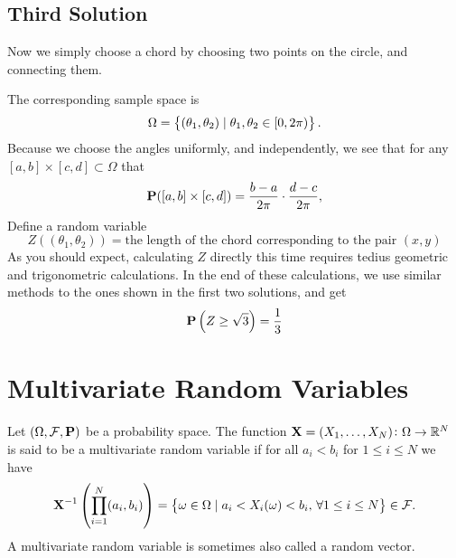 \documentclass[11pt,a4paper]{article}
\begin{document}
  \subsection{Third Solution}
    Now we simply choose a chord by choosing two points on the circle, and
    connecting them.
    \begin{center}
    \end{center}
    The corresponding sample space is
    \[
      \Omega = \set{(\theta_1, \theta_2) \mid \theta_1, \theta_2 \in [0,2 \pi)}.
    \]
    Because we choose the angles uniformly, and independently,
    we see that for any
    $[a,b] \times [c,d] \subset \Omega$ that
    \[
      \mathbf{P}([a,b] \times [c,d]) =
      \frac{b-a}{2 \pi} \cdot \frac{d-c}{2 \pi},
    \]
    Define a random variable
    \[
      Z\left((\theta_1, \theta_2)\right) = 
      \text{the length of the chord corresponding to the pair $(x, y)$}
    \]
    As you should expect, calculating $Z$ directly this time requires
    tedius geometric and trigonometric calculations.
    In the end of these calculations, we use similar methods to the ones
    shown in the first two solutions, and get
    \[
      \mathbf{P}\left(Z \geq \sqrt{3}\right) = 
      \frac{1}{3}
    \]

  \newpage

  \section{Multivariate Random Variables}
  \begin{definition}
    Let $(\Omega, \mathcal F, \mathbf{P})$ be a probability space.
    The function $\boldsymbol{\mathbf{X}} = (X_1,\dots,X_N) \colon \Omega \to \mathbb{R}^N$ is said
    to be a multivariate random variable if for all $a_i < b_i$ for 
    $1 \le i \le N$ we have
    \[
      \boldsymbol{\mathbf{X}}^{-1}\left(\prod_{i=1}^{N} (a_i, b_i)\right) =
      \set{\omega \in \Omega \mid
      a_i < X_i(\omega) < b_i,\, \forall 1 \le i \le N} \in
      \mathcal F.
    \]
    A multivariate random variable is sometimes also called a random vector.
  \end{definition}
  
\end{document}
